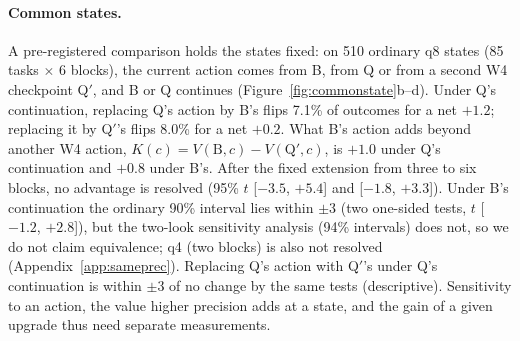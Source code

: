 \paragraph{Common states.} A pre-registered comparison holds the states fixed: on 510 ordinary q8 states (85 tasks $\times$ 6 blocks), the current action comes from B, from Q or from a second W4 checkpoint Q$'$, and B or Q continues (Figure~\ref{fig:commonstate}b--d). Under Q's continuation, replacing Q's action by B's flips 7.1\% of outcomes for a net $+1.2$\pp{}; replacing it by Q$'$'s flips 8.0\% for a net $+0.2$\pp{}. What B's action adds beyond another W4 action, $K(c)=V(\mathrm{B},c)-V(\mathrm{Q}',c)$, is $+1.0$\pp{} under Q's continuation and $+0.8$\pp{} under B's. After the fixed extension from three to six blocks, no advantage is resolved (95\% $t$ [$-3.5$, $+5.4$] and [$-1.8$, $+3.3$]). Under B's continuation the ordinary 90\% interval lies within $\pm$3\pp{} (two one-sided tests, $t$ [$-1.2$, $+2.8$]), but the two-look sensitivity analysis (94\% intervals) does not, so we do not claim equivalence; q4 (two blocks) is also not resolved (Appendix~\ref{app:sameprec}). Replacing Q's action with Q$'$'s under Q's continuation is within $\pm$3\pp{} of no change by the same tests (descriptive). Sensitivity to an action, the value higher precision adds at a state, and the gain of a given upgrade thus need separate measurements. %


